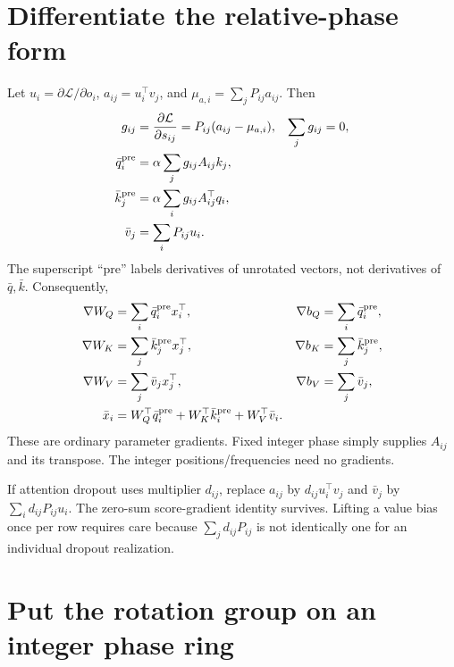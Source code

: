 \documentclass[11pt]{article}
\begin{document}
\section{Differentiate the relative-phase form}

Let $u_i=\partial\mathcal L/\partial o_i$, $a_{ij}=u_i^\top v_j$, and $\mu_{a,i}=\sum_jP_{ij}a_{ij}$. Then
\begin{align}
 g_{ij}&=\frac{\partial\mathcal L}{\partial s_{ij}}
 =P_{ij}(a_{ij}-\mu_{a,i}),&\sum_jg_{ij}&=0,\\
 \bar q_i^{\rm pre}&=\alpha\sum_jg_{ij}A_{ij}k_j,\\
 \bar k_j^{\rm pre}&=\alpha\sum_i g_{ij}A_{ij}^\top q_i,\\
 \bar v_j&=\sum_iP_{ij}u_i.
\end{align}
The superscript ``pre'' labels derivatives of unrotated vectors, not derivatives of $\bar q,\bar k$. Consequently,
\begin{align}
 \nabla W_Q&=\sum_i\bar q_i^{\rm pre}x_i^\top,&\nabla b_Q&=\sum_i\bar q_i^{\rm pre},\\
 \nabla W_K&=\sum_j\bar k_j^{\rm pre}x_j^\top,&\nabla b_K&=\sum_j\bar k_j^{\rm pre},\\
 \nabla W_V&=\sum_j\bar v_jx_j^\top,&\nabla b_V&=\sum_j\bar v_j,\\
 \bar x_i&=W_Q^\top\bar q_i^{\rm pre}+W_K^\top\bar k_i^{\rm pre}+W_V^\top\bar v_i.
\end{align}
These are ordinary parameter gradients. Fixed integer phase simply supplies $A_{ij}$ and its transpose. The integer positions/frequencies need no gradients.

If attention dropout uses multiplier $d_{ij}$, replace $a_{ij}$ by $d_{ij}u_i^\top v_j$ and $\bar v_j$ by $\sum_i d_{ij}P_{ij}u_i$. The zero-sum score-gradient identity survives. Lifting a value bias once per row requires care because $\sum_jd_{ij}P_{ij}$ is not identically one for an individual dropout realization.

\section{Put the rotation group on an integer phase ring}
\end{document}
